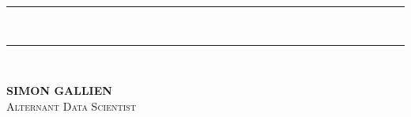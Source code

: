 \documentclass[a4paper,12pt]{article}
\begin{document}

\vspace*{0.5em}
\noindent
\hspace*{1.5em}
\begin{minipage}[t]{0.02\linewidth}
  \colorbox{black}{\rule{2pt}{2em}}\\[-1pt]
  \colorbox{black}{\rule{2pt}{2em}}\\[1pt]
\end{minipage}
\hspace{1em}
\begin{minipage}[t]{\dimexpr\linewidth-3em\relax}
  {\titlefont\Huge \textbf{SIMON GALLIEN}}\\[1em]
  {\titlefont\Large \textsc{Alternant Data Scientist}}
\end{minipage}




\vspace{-0.5em}

\end{document}
